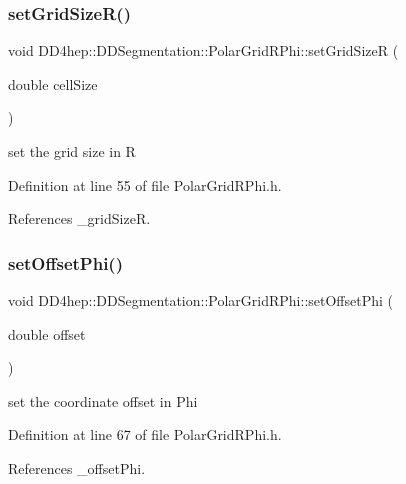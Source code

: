 \subsubsection{\texorpdfstring{set\+Grid\+Size\+R()}{setGridSizeR()}}
{\footnotesize\ttfamily void D\+D4hep\+::\+D\+D\+Segmentation\+::\+Polar\+Grid\+R\+Phi\+::set\+Grid\+SizeR (\begin{DoxyParamCaption}\item[{double}]{cell\+Size }\end{DoxyParamCaption})\hspace{0.3cm}{\ttfamily [inline]}}



set the grid size in R 



Definition at line 55 of file Polar\+Grid\+R\+Phi.\+h.



References \+\_\+grid\+SizeR.

\hypertarget{class_d_d4hep_1_1_d_d_segmentation_1_1_polar_grid_r_phi_a7724a483741721da3d8418623d75e351}{}\label{class_d_d4hep_1_1_d_d_segmentation_1_1_polar_grid_r_phi_a7724a483741721da3d8418623d75e351} 
\subsubsection{\texorpdfstring{set\+Offset\+Phi()}{setOffsetPhi()}}
{\footnotesize\ttfamily void D\+D4hep\+::\+D\+D\+Segmentation\+::\+Polar\+Grid\+R\+Phi\+::set\+Offset\+Phi (\begin{DoxyParamCaption}\item[{double}]{offset }\end{DoxyParamCaption})\hspace{0.3cm}{\ttfamily [inline]}}



set the coordinate offset in Phi 



Definition at line 67 of file Polar\+Grid\+R\+Phi.\+h.



References \+\_\+offset\+Phi.

\hypertarget{class_d_d4hep_1_1_d_d_segmentation_1_1_polar_grid_r_phi_ab3ee969820f45192085b4f8a51883dc4}{}\label{class_d_d4hep_1_1_d_d_segmentation_1_1_polar_grid_r_phi_ab3ee969820f45192085b4f8a51883dc4} 
